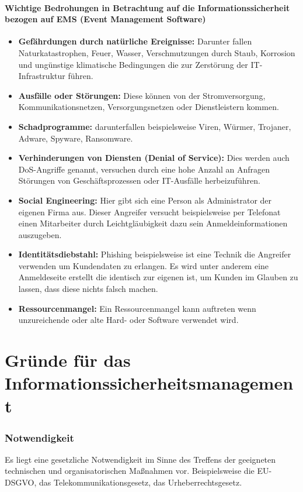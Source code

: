 \paragraph{Wichtige Bedrohungen in Betrachtung auf die Informationssicherheit bezogen auf EMS (Event Management Software)}
\begin{itemize}
	\item \textbf{Gefährdungen durch natürliche Ereignisse:} Darunter fallen Naturkatastrophen, Feuer, Wasser, Verschmutzungen durch Staub, Korrosion und ungünstige klimatische Bedingungen die zur Zerstörung der IT-Infrastruktur führen.
	\item \textbf{Ausfälle oder Störungen:} Diese können von der Stromversorgung, Kommunikationsnetzen, Versorgungsnetzen oder Dienstleistern kommen.
	\item \textbf{Schadprogramme:} darunterfallen beispielsweise Viren, Würmer, Trojaner, Adware, Spyware, Ransomware.
	\item \textbf{Verhinderungen von Diensten (Denial of Service):} Dies werden auch DoS-Angriffe genannt, versuchen durch eine hohe Anzahl an Anfragen Störungen von Geschäftsprozessen oder IT-Ausfälle herbeizuführen.
	\item \textbf{Social Engineering:} Hier gibt sich eine Person als Administrator der eigenen Firma aus. Dieser Angreifer versucht beispielsweise per Telefonat einen Mitarbeiter durch Leichtgläubigkeit dazu  sein Anmeldeinformationen auszugeben.
	\item \textbf{Identitätsdiebstahl:} Phishing beispielsweise ist eine Technik die Angreifer verwenden um Kundendaten zu erlangen. Es wird unter anderem eine Anmeldeseite erstellt die identisch zur eigenen ist, um Kunden im Glauben zu lassen, dass diese nichts falsch machen.
	\item \textbf{Ressourcenmangel:} Ein Ressourcenmangel kann auftreten wenn unzureichende oder alte Hard- oder Software verwendet wird. 
\end{itemize}

\section{Gründe für das Informationssicherheitsmanagement}
\subsubsection{Notwendigkeit}
Es liegt eine gesetzliche Notwendigkeit im Sinne des Treffens der geeigneten technischen und organisatorischen Maßnahmen vor. Beispielsweise die EU-DSGVO, das Telekommunikationsgesetz, das Urheberrechtsgesetz.


